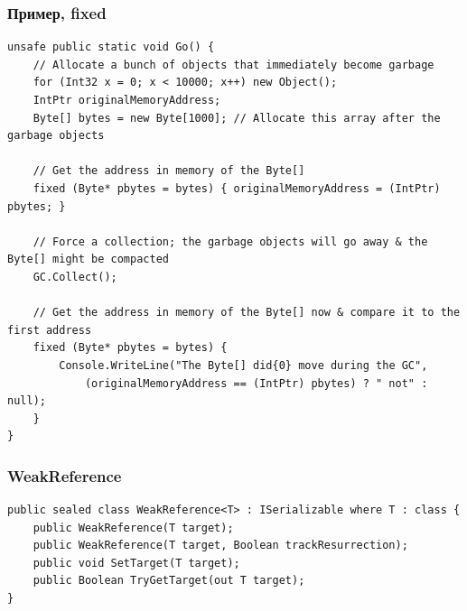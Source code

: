 \documentclass{../../slides-style}
\begin{document}
    \begin{frame}[fragile]
        \frametitle{Пример, fixed}
        \begin{scriptsize}
            \begin{verbatim}
unsafe public static void Go() {
    // Allocate a bunch of objects that immediately become garbage
    for (Int32 x = 0; x < 10000; x++) new Object();
    IntPtr originalMemoryAddress;
    Byte[] bytes = new Byte[1000]; // Allocate this array after the garbage objects

    // Get the address in memory of the Byte[]
    fixed (Byte* pbytes = bytes) { originalMemoryAddress = (IntPtr) pbytes; }

    // Force a collection; the garbage objects will go away & the Byte[] might be compacted
    GC.Collect();

    // Get the address in memory of the Byte[] now & compare it to the first address
    fixed (Byte* pbytes = bytes) {
        Console.WriteLine("The Byte[] did{0} move during the GC",
            (originalMemoryAddress == (IntPtr) pbytes) ? " not" : null);
    }
}
            \end{verbatim}
        \end{scriptsize}
    \end{frame}

    \begin{frame}[fragile]
        \frametitle{WeakReference}
        \begin{scriptsize}
            \begin{verbatim}
public sealed class WeakReference<T> : ISerializable where T : class {
    public WeakReference(T target);
    public WeakReference(T target, Boolean trackResurrection);
    public void SetTarget(T target);
    public Boolean TryGetTarget(out T target);
}
            \end{verbatim}
        \end{scriptsize}
    \end{frame}
\end{document}

